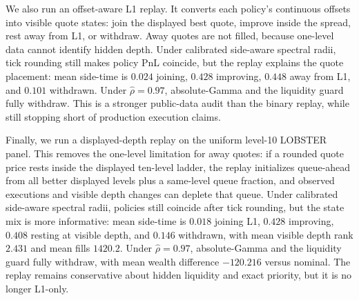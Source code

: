 \documentclass[11pt]{article}
\begin{document}
We also run an offset-aware L1 replay. It converts each policy's continuous
offsets into visible quote states: join the displayed best quote, improve
inside the spread, rest away from L1, or withdraw. Away quotes are not filled,
because one-level data cannot identify hidden depth. Under calibrated
side-aware spectral radii, tick rounding still makes policy PnL coincide, but
the replay explains the quote placement: mean side-time is $0.024$ joining,
$0.428$ improving, $0.448$ away from L1, and $0.101$ withdrawn. Under
$\hat\rho=0.97$, absolute-Gamma and the liquidity guard fully withdraw. This
is a stronger public-data audit than the binary replay, while still stopping
short of production execution claims.

Finally, we run a displayed-depth replay on the uniform level-10 LOBSTER panel.
This removes the one-level limitation for away quotes: if a rounded quote price
rests inside the displayed ten-level ladder, the replay initializes queue-ahead
from all better displayed levels plus a same-level queue fraction, and observed
executions and visible depth changes can deplete that queue. Under calibrated
side-aware spectral radii, policies still coincide after tick rounding, but the
state mix is more informative: mean side-time is $0.018$ joining L1, $0.428$
improving, $0.408$ resting at visible depth, and $0.146$ withdrawn, with mean
visible depth rank $2.431$ and mean fills $1420.2$. Under $\hat\rho=0.97$,
absolute-Gamma and the liquidity guard fully withdraw, with mean wealth
difference $-120.216$ versus nominal. The replay remains conservative about
hidden liquidity and exact priority, but it is no longer L1-only.
\end{document}
